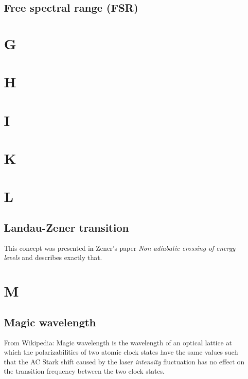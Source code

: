 \documentclass{book}
\theoremstyle{definition}
\begin{document}
\section*{Free spectral range (FSR)}


\chapter*{G}
\chapter*{H}
\chapter*{I}
\chapter*{K}
\chapter*{L}


\section*{Landau-Zener transition}


This concept was presented in Zener's paper \textit{Non-adiabatic crossing of energy levels} \cite{zener1932non} and describes exactly that. 




\chapter*{M}



\section*{Magic wavelength}



From Wikipedia: Magic wavelength is the wavelength of an optical lattice at which the polarizabilities of two atomic clock states have the same values such that the AC Stark shift caused by the laser \textit{intensity} fluctuation has no effect on the transition frequency between the two clock states.\\
\end{document}
